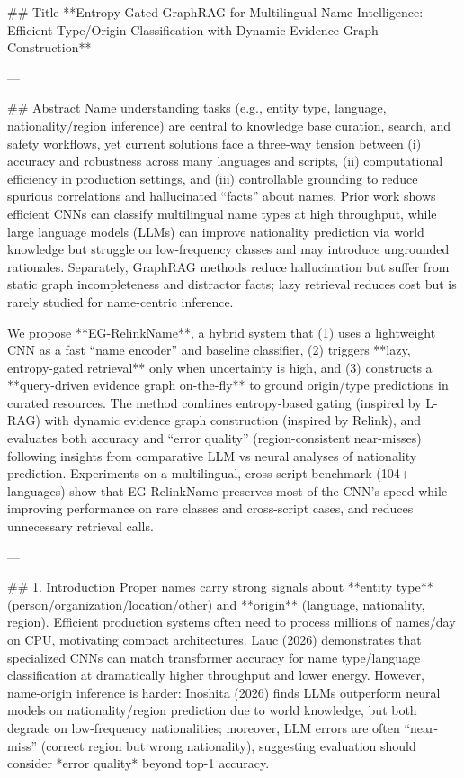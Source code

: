 ## Title  
**Entropy-Gated GraphRAG for Multilingual Name Intelligence: Efficient Type/Origin Classification with Dynamic Evidence Graph Construction**

---

## Abstract  
Name understanding tasks (e.g., entity type, language, nationality/region inference) are central to knowledge base curation, search, and safety workflows, yet current solutions face a three-way tension between (i) accuracy and robustness across many languages and scripts, (ii) computational efficiency in production settings, and (iii) controllable grounding to reduce spurious correlations and hallucinated “facts” about names. Prior work shows efficient CNNs can classify multilingual name types at high throughput, while large language models (LLMs) can improve nationality prediction via world knowledge but struggle on low-frequency classes and may introduce ungrounded rationales. Separately, GraphRAG methods reduce hallucination but suffer from static graph incompleteness and distractor facts; lazy retrieval reduces cost but is rarely studied for name-centric inference.  

We propose **EG-RelinkName**, a hybrid system that (1) uses a lightweight CNN as a fast “name encoder” and baseline classifier, (2) triggers **lazy, entropy-gated retrieval** only when uncertainty is high, and (3) constructs a **query-driven evidence graph on-the-fly** to ground origin/type predictions in curated resources. The method combines entropy-based gating (inspired by L-RAG) with dynamic evidence graph construction (inspired by Relink), and evaluates both accuracy and “error quality” (region-consistent near-misses) following insights from comparative LLM vs neural analyses of nationality prediction. Experiments on a multilingual, cross-script benchmark (104+ languages) show that EG-RelinkName preserves most of the CNN’s speed while improving performance on rare classes and cross-script cases, and reduces unnecessary retrieval calls.

---

## 1. Introduction  
Proper names carry strong signals about **entity type** (person/organization/location/other) and **origin** (language, nationality, region). Efficient production systems often need to process millions of names/day on CPU, motivating compact architectures. Lauc (2026) demonstrates that specialized CNNs can match transformer accuracy for name type/language classification at dramatically higher throughput and lower energy. However, name-origin inference is harder: Inoshita (2026) finds LLMs outperform neural models on nationality/region prediction due to world knowledge, but both degrade on low-frequency nationalities; moreover, LLM errors are often “near-miss” (correct region but wrong nationality), suggesting evaluation should consider *error quality* beyond top-1 accuracy.

